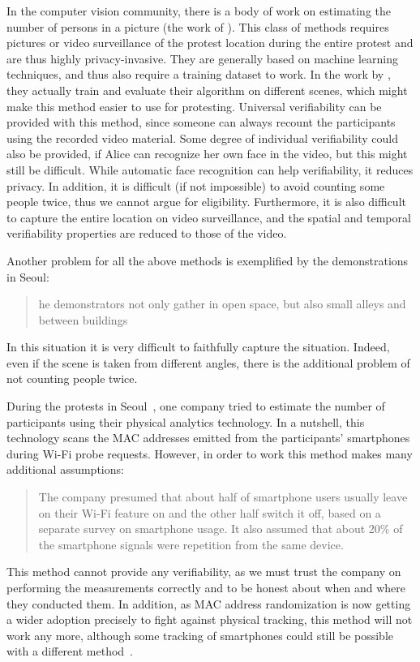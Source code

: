 In the computer vision community, there is a body of work on estimating the number of persons in a picture (\eg the work of \cite{NNCrowdCounting}).
This class of methods requires pictures or video surveillance of the protest location during the entire protest and are thus highly privacy-invasive.
They are generally based on machine learning techniques, and thus also require a training dataset to work.
In the work by \cite{NNCrowdCounting}, they actually train and evaluate their algorithm on different scenes, which might make this method easier to use for protesting.
Universal verifiability can be provided with this method, since someone can always recount the participants using the recorded video material.
Some degree of individual verifiability could also be provided,
if Alice can recognize her own face in the video, but this might still be difficult. 
While automatic face recognition can help verifiability, it reduces privacy.
In addition, it is difficult (if not impossible) to avoid counting some people twice, thus we cannot argue for eligibility.
Furthermore, it is also difficult to capture the entire location on video surveillance, %
 and the spatial and temporal verifiability properties are reduced to those of the video.

Another problem for all the above methods is exemplified by the demonstrations in Seoul:
\blockcquote{2016DemonstrationsInSeoul}{%
  he demonstrators not only gather in open space, but also small alleys and between buildings%
}.
In this situation it is very difficult to faithfully capture the situation.
Indeed, even if the scene is taken from different angles, there is the additional problem of not counting people twice.

During the protests in Seoul~\cite{2016DemonstrationsInSeoul}, one company tried to estimate the number of participants using their physical analytics technology.
In a nutshell, this technology scans the MAC addresses emitted from the participants' smartphones during Wi-Fi probe requests.
However, in order to work this method makes many additional assumptions:
\blockcquote{2016DemonstrationsInSeoul}{%
The company presumed that about half of smartphone users usually leave on their Wi-Fi feature on and the other half switch it off, based on a separate survey on smartphone usage. 
It also assumed that about 20\% of the smartphone signals were repetition from the same device.
}
This method cannot provide any verifiability, as we must trust the company on performing the measurements correctly and to be honest about when and where they conducted them.
In addition, as MAC address randomization is now getting a wider adoption precisely to fight against physical tracking, this method will not work any more, although some tracking of smartphones could still be possible with a different method~\cite{WhyMACRandomizationIsNotEnough}.

